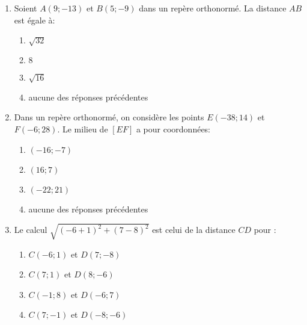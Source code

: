 \documentclass[a4paper]{article}
\begin{document}
\begin{enumerate}[resume]
  \item Soient $A(9;-13)$ et $B(5;-9)$ dans un repère orthonormé. La distance $AB$ est égale à:
    \begin{multicols}{4}
      \begin{enumerate}
	\item $\sqrt{32}$
	\item $8$
	\item $\sqrt{16}$
	\item aucune des réponses précédentes
      \end{enumerate}
    \end{multicols}    
  \item Dans un repère orthonormé, on considère les points $E(-38;14)$ et $F(-6;28)$. Le milieu de $[EF]$ a pour coordonnées:
    \begin{multicols}{4}
      \begin{enumerate}
	\item $(-16;-7)$
	\item $(16;7)$
	\item $(-22;21)$
	\item aucune des réponses précédentes
      \end{enumerate}
    \end{multicols}
  \item Le calcul $\sqrt{(-6+1)^{2}+(7-8)^{2}}$ est celui de la distance $CD$ pour :
    \begin{multicols}{2}
      \begin{enumerate}
	\item $C(-6;1)$ et $D(7;-8)$
	\item $C(7;1)$ et $D(8;-6)$
	\item $C(-1;8)$ et $D(-6;7)$
	\item $C(7;-1)$ et $D(-8;-6)$
      \end{enumerate}
    \end{multicols}
\end{enumerate}

\bigskip
\end{document}
